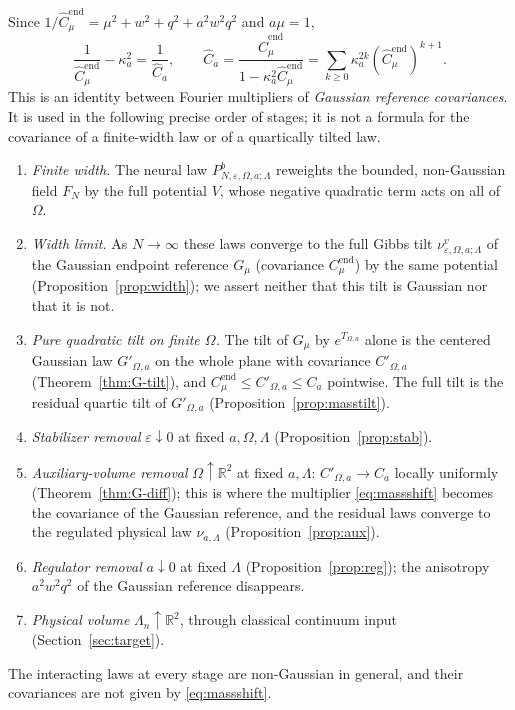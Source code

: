 \documentclass[11pt]{article}
\theoremstyle{plain}
\theoremstyle{definition}
\theoremstyle{remark}
\newcommand{\R}{\mathbb{R}}
\newcommand{\Cend}{C^{\mathrm{end}}_{\mu}}
\newcommand{\hCend}{\hat C^{\mathrm{end}}_{\mu}}
\begin{document}
Since $1/\hCend=\mu^{2}+w^{2}+q^{2}+a^{2}w^{2}q^{2}$ and $a\mu=1$,
\begin{equation}\label{eq:massshift}
\frac{1}{\hCend}-\kappa_a^{2}=\frac{1}{\hat C_a},\qquad
\hat C_a=\frac{\hCend}{1-\kappa_a^{2}\hCend}=\sum_{k\ge0}\kappa_a^{2k}(\hCend)^{k+1}.
\end{equation}
This is an identity between Fourier multipliers of \emph{Gaussian reference
covariances}. It is used in the following precise order of stages; it is not a
formula for the covariance of a finite-width law or of a quartically tilted law.
\begin{enumerate}[label=(\arabic*)]
\item \emph{Finite width.} The neural law $P^{b}_{N,\varepsilon,\Omega,a;\Lambda}$
  reweights the bounded, non-Gaussian field $F_N$ by the full potential $V$,
  whose negative quadratic term acts on all of $\Omega$.
\item \emph{Width limit.} As $N\to\infty$ these laws converge to the full Gibbs
  tilt $\nu^{v}_{\varepsilon,\Omega,a;\Lambda}$ of the Gaussian endpoint
  reference $G_\mu$ (covariance $\Cend$) by the same potential
  (Proposition~\ref{prop:width}); we assert neither that this tilt is Gaussian
  nor that it is not.
\item \emph{Pure quadratic tilt on finite $\Omega$.} The tilt of $G_\mu$ by
  $e^{T_{\Omega,a}}$ alone is the centered Gaussian law $G'_{\Omega,a}$ on the
  whole plane with covariance $C'_{\Omega,a}$ (Theorem~\ref{thm:G-tilt}), and
  $\Cend\le C'_{\Omega,a}\le C_a$ pointwise. The full tilt is the residual
  quartic tilt of $G'_{\Omega,a}$ (Proposition~\ref{prop:masstilt}).
\item \emph{Stabilizer removal} $\varepsilon\downarrow0$ at fixed $a,\Omega,\Lambda$
  (Proposition~\ref{prop:stab}).
\item \emph{Auxiliary-volume removal} $\Omega\uparrow\R^{2}$ at fixed $a,\Lambda$:
  $C'_{\Omega,a}\to C_a$ locally uniformly (Theorem~\ref{thm:G-diff}); this is
  where the multiplier \eqref{eq:massshift} becomes the covariance of the
  Gaussian reference, and the residual laws converge to the regulated physical
  law $\nu_{a,\Lambda}$ (Proposition~\ref{prop:aux}).
\item \emph{Regulator removal} $a\downarrow0$ at fixed $\Lambda$
  (Proposition~\ref{prop:reg}); the anisotropy $a^{2}w^{2}q^{2}$ of the Gaussian
  reference disappears.
\item \emph{Physical volume} $\Lambda_n\uparrow\R^{2}$, through classical
  continuum input (Section~\ref{sec:target}).
\end{enumerate}
The interacting laws at every stage are non-Gaussian in general, and their
covariances are not given by \eqref{eq:massshift}.
\end{document}
